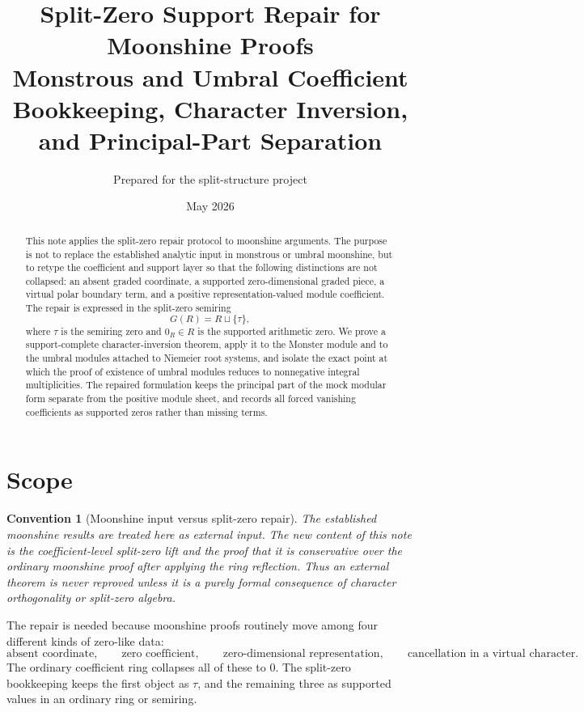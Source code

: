 \documentclass[11pt]{article}
\title{Split-Zero Support Repair for Moonshine Proofs\\
Monstrous and Umbral Coefficient Bookkeeping, Character Inversion, and Principal-Part Separation}
\author{Prepared for the split-structure project}
\date{May 2026}
\newtheorem{convention}[theorem]{Convention}
\begin{document}
\maketitle

\begin{abstract}
This note applies the split-zero repair protocol to moonshine arguments.  The purpose is not to replace the established analytic input in monstrous or umbral moonshine, but to retype the coefficient and support layer so that the following distinctions are not collapsed: an absent graded coordinate, a supported zero-dimensional graded piece, a virtual polar boundary term, and a positive representation-valued module coefficient.  The repair is expressed in the split-zero semiring
\[
G(R)=R\sqcup\{\tau\},
\]
where \(\tau\) is the semiring zero and \(0_R\in R\) is the supported arithmetic zero.  We prove a support-complete character-inversion theorem, apply it to the Monster module and to the umbral modules attached to Niemeier root systems, and isolate the exact point at which the proof of existence of umbral modules reduces to nonnegative integral multiplicities.  The repaired formulation keeps the principal part of the mock modular form separate from the positive module sheet, and records all forced vanishing coefficients as supported zeros rather than missing terms.
\end{abstract}

\tableofcontents

\section{Scope}

\begin{convention}[Moonshine input versus split-zero repair]
The established moonshine results are treated here as external input.  The new content of this note is the coefficient-level split-zero lift and the proof that it is conservative over the ordinary moonshine proof after applying the ring reflection.  Thus an external theorem is never reproved unless it is a purely formal consequence of character orthogonality or split-zero algebra.
\end{convention}

The repair is needed because moonshine proofs routinely move among four different kinds of zero-like data:
\[
\boxed{\text{absent coordinate}},\qquad
\boxed{\text{zero coefficient}},\qquad
\boxed{\text{zero-dimensional representation}},\qquad
\boxed{\text{cancellation in a virtual character}}.
\]
The ordinary coefficient ring collapses all of these to \(0\).  The split-zero bookkeeping keeps the first object as \(\tau\), and the remaining three as supported values in an ordinary ring or semiring.
\end{document}
